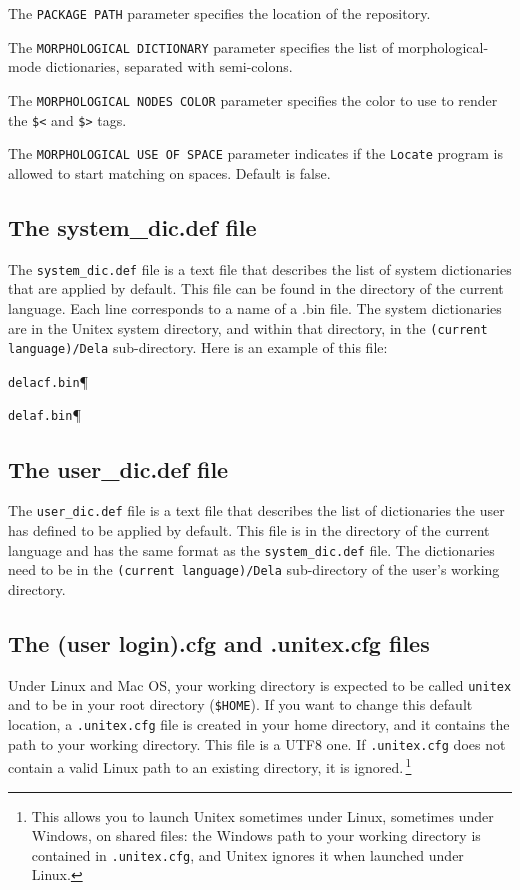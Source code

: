 \bigskip
\noindent The \verb+PACKAGE PATH+ parameter specifies the location of the
repository.

\bigskip
\noindent The \verb+MORPHOLOGICAL DICTIONARY+ parameter specifies the list of
morphological-mode dictionaries, separated with semi-colons.

\bigskip
\noindent The \verb+MORPHOLOGICAL NODES COLOR+ parameter specifies the color
to use to render the \verb+$<+ and \verb+$>+ tags. 

\bigskip
\noindent The \verb+MORPHOLOGICAL USE OF SPACE+ parameter indicates if the
\verb+Locate+ program is allowed to start matching on spaces. Default is false. 


\subsection{The system\_dic.def file}
The \verb+system_dic.def+ file is a text file that describes the list of system
dictionaries that are applied by default. This file can be found in the directory
of the current language. Each line corresponds to a name of a .bin file. The
system dictionaries are in the Unitex system directory,
and within that directory, in the
\verb+(current language)/Dela+ sub-directory.  Here is an
example of this file:


\bigskip
\verb$delacf.bin$\P

\verb$delaf.bin$\P

\subsection{The user\_dic.def file}
The \verb+user_dic.def+ file is a text file that describes the list of
dictionaries the user has defined to be applied by default. This file is in the
directory of the current language and has the same format as the
\verb+system_dic.def+ file. 
The dictionaries need to be in the \verb+(current language)/Dela+ sub-directory of the
user's working directory.

\subsection{The (user login).cfg and .unitex.cfg files}
Under Linux and Mac OS, your working directory is expected to be called
\verb+unitex+ and to be in your root directory (\verb+$HOME+). If you want
to change this default location, a \verb+.unitex.cfg+ file is created in your home directory, and
it contains the path to your working directory. This file is a UTF8 one. If \verb+.unitex.cfg+
does not contain a valid Linux path to an existing directory, it is ignored.\,\footnote{This allows you
to launch Unitex sometimes under Linux, sometimes under Windows, on shared files: the Windows path to your
working directory is contained in \texttt{.unitex.cfg}, and Unitex ignores it when launched
under Linux.}

